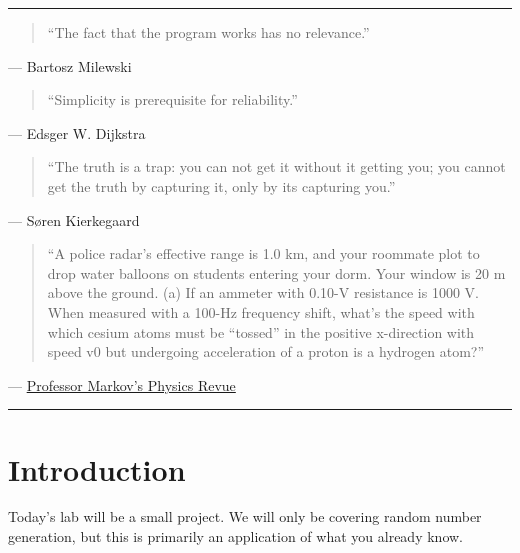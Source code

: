 \documentclass[11pt]{cselabheader}
\title{\thetitle}
\author{\theauthor}
\date{NMT Department of Computer Science and Engineering}
\begin{document}
\maketitle
\hrule

\begin{quotation}
``The fact that the program works has no relevance.''
\end{quotation}
\begin{flushright}
  --- Bartosz Milewski 
\end{flushright}


\begin{quotation}
``Simplicity is prerequisite for reliability.''
\end{quotation}
\begin{flushright}
--- Edsger W. Dijkstra
\end{flushright}


\begin{quotation}
``The truth is a trap: you can not get it without it getting you; you cannot get
the truth by capturing it, only by its capturing you.''
\end{quotation}
\begin{flushright}
--- S{\o}ren Kierkegaard
\end{flushright}

\begin{quotation}
  ``A police radar’s effective range is 1.0 km, and your roommate plot to drop water balloons on students entering your dorm. Your window is 20 m above the ground. (a) If an ammeter with 0.10-V resistance is 1000 V. When measured with a 100-Hz frequency shift, what’s the speed with which cesium atoms must be ``tossed'' in the positive x-direction with speed v0 but undergoing acceleration of a proton is a hydrogen atom?''
\end{quotation}
\begin{flushright}
  --- \href{http://infohost.nmt.edu/~rkelly/physbot.html}{Professor Markov's Physics Revue}
\end{flushright}

\hrule

\newpage
\section{Introduction}

Today's lab will be a small project. We will only be covering random number
generation, but this is primarily an application of what you already know.
\end{document}

